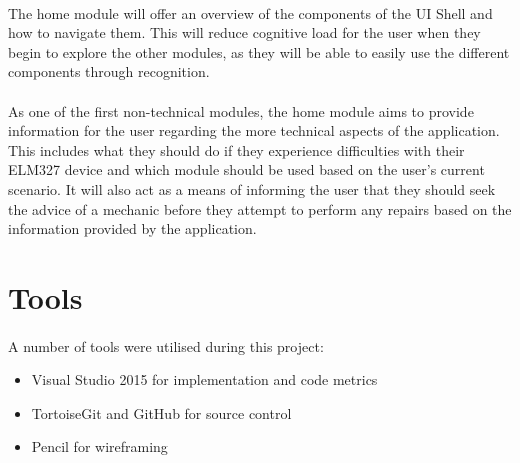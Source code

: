 		\paragraph{}{
		The home module will offer an overview of the components of the UI Shell and how to navigate them. This will reduce cognitive load for the user when they begin to explore the other modules, as they will be able to easily use the different components through recognition.
		}
		
		\paragraph{}{
		As one of the first non-technical modules, the home module aims to provide information for the user regarding the more technical aspects of the application. This includes what they should do if they experience difficulties with their ELM327 device and which module should be used based on the user's current scenario. It will also act as a means of informing the user that they should seek the advice of a mechanic before they attempt to perform any repairs based on the information provided by the application.
		}

\section{Tools}
	\paragraph{}{
	A number of tools were utilised during this project:
		\begin{itemize}
			\item Visual Studio 2015 for implementation and code metrics 
			\item TortoiseGit and GitHub for source control
			\item Pencil for wireframing
		\end{itemize}
	}